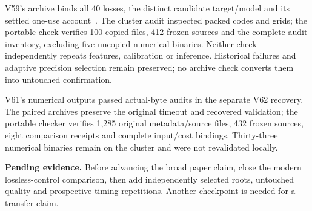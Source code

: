 \documentclass[10pt,twocolumn,letterpaper]{article}
\newcommand{\pending}[1]{\par\noindent\textbf{Pending evidence.} #1\par}
\begin{document}
V59's archive binds all 40 losses, the distinct candidate target/model and its
settled one-use account~\cite{v59terminal}. The cluster audit inspected packed
codes and grids; the portable check verifies 100 copied files, 412 frozen sources
and the complete audit inventory, excluding five uncopied numerical binaries.
Neither check independently repeats features, calibration or inference.
Historical failures and adaptive precision selection remain preserved; no archive
check converts them into untouched confirmation.

V61's numerical outputs passed actual-byte audits in the separate V62 recovery.
The paired archives preserve the original timeout and recovered validation;
the portable checker verifies 1,285 original metadata/source files, 432 frozen
sources, eight comparison receipts and complete input/cost bindings. Thirty-three
numerical binaries remain on the cluster and were not revalidated locally.

\pending{Before advancing the broad paper claim, close the modern lossless-control
comparison, then add independently selected roots, untouched quality and
prospective timing repetitions. Another checkpoint is needed for a transfer claim.}
\end{document}
